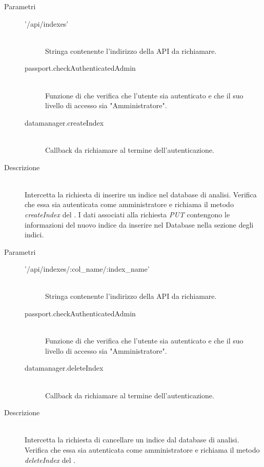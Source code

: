 \begin{description}
\begin{description}
\begin{mldescription}
     \hfill 
    \begin{description}
    \item[Parametri] \hfill
     \begin{description}
      \item['/api/indexes'] \hfill \\
      Stringa contenente l'indirizzo della API da richiamare.
      \item[passport.checkAuthenticatedAdmin] \hfill \\
      Funzione di  che verifica che l'utente sia autenticato e che il suo livello di accesso sia "Amministratore".
      \item[datamanager.createIndex] \hfill \\
      Callback da richiamare al termine dell'autenticazione.
     \end{description}
    \item[Descrizione] \hfill \\
    Intercetta la richiesta di inserire un indice nel database di analisi. Verifica che essa sia autenticata come amministratore e richiama il metodo \textit{createIndex} del . I dati associati alla richiesta \textit{PUT} contengono le informazioni del nuovo indice da inserire nel Database nella sezione degli indici. 
    \end{description}
    
     \hfill 
 \begin{description}
    \item[Parametri] \hfill
     \begin{description}
      \item['/api/indexes/:col\_name/:index\_name'] \hfill \\
      Stringa contenente l'indirizzo della API da richiamare.
      \item[passport.checkAuthenticatedAdmin] \hfill \\
      Funzione di  che verifica che l'utente sia autenticato e che il suo livello di accesso sia "Amministratore".
      \item[datamanager.deleteIndex] \hfill \\
      Callback da richiamare al termine dell'autenticazione.
     \end{description}
    \item[Descrizione] \hfill \\
    Intercetta la richiesta di cancellare un indice dal database di analisi. Verifica che essa sia autenticata come amministratore e richiama il metodo \textit{deleteIndex} del .
   \end{description}
 

\end{mldescription}
\end{description}
\end{description}

